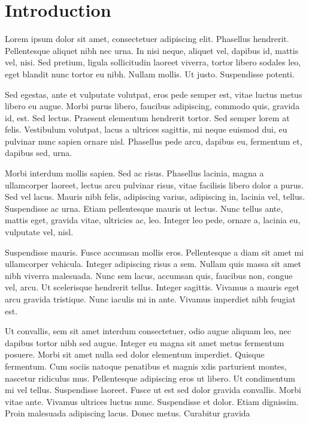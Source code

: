 \section{Introduction}

Lorem ipsum dolor sit amet, consectetuer adipiscing elit. Phasellus hendrerit. Pellentesque aliquet nibh nec urna. In nisi neque, aliquet vel, dapibus id, mattis vel, nisi. Sed pretium, ligula sollicitudin laoreet viverra, tortor libero sodales leo, eget blandit nunc tortor eu nibh. Nullam mollis. Ut justo. Suspendisse potenti.

Sed egestas, ante et vulputate volutpat, eros pede semper est, vitae luctus metus libero eu augue. Morbi purus libero, faucibus adipiscing, commodo quis, gravida id, est. Sed lectus. Praesent elementum hendrerit tortor. Sed semper lorem at felis. Vestibulum volutpat, lacus a ultrices sagittis, mi neque euismod dui, eu pulvinar nunc sapien ornare nisl. Phasellus pede arcu, dapibus eu, fermentum et, dapibus sed, urna.

Morbi interdum mollis sapien. Sed ac risus. Phasellus lacinia, magna a ullamcorper laoreet, lectus arcu pulvinar risus, vitae facilisis libero dolor a purus. Sed vel lacus. Mauris nibh felis, adipiscing varius, adipiscing in, lacinia vel, tellus. Suspendisse ac urna. Etiam pellentesque mauris ut lectus. Nunc tellus ante, mattis eget, gravida vitae, ultricies ac, leo. Integer leo pede, ornare a, lacinia eu, vulputate vel, nisl.

Suspendisse mauris. Fusce accumsan mollis eros. Pellentesque a diam sit amet mi ullamcorper vehicula. Integer adipiscing risus a sem. Nullam quis massa sit amet nibh viverra malesuada. Nunc sem lacus, accumsan quis, faucibus non, congue vel, arcu. Ut scelerisque hendrerit tellus. Integer sagittis. Vivamus a mauris eget arcu gravida tristique. Nunc iaculis mi in ante. Vivamus imperdiet nibh feugiat est.

Ut convallis, sem sit amet interdum consectetuer, odio augue aliquam leo, nec dapibus tortor nibh sed augue. Integer eu magna sit amet metus fermentum posuere. Morbi sit amet nulla sed dolor elementum imperdiet. Quisque fermentum. Cum sociis natoque penatibus et magnis xdis parturient montes, nascetur ridiculus mus. Pellentesque adipiscing eros ut libero. Ut condimentum mi vel tellus. Suspendisse laoreet. Fusce ut est sed dolor gravida convallis. Morbi vitae ante. Vivamus ultrices luctus nunc. Suspendisse et dolor. Etiam dignissim. Proin malesuada adipiscing lacus. Donec metus. Curabitur gravida
